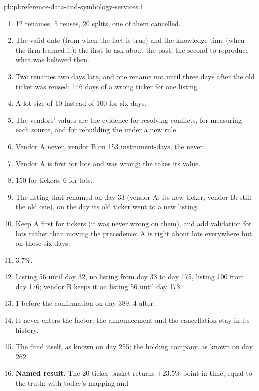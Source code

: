 \begin{solution}{pb:pl:reference-data-and-symbology-services:1}
\begin{enumerate}
\item 12 renames, 5 reuses, 20 splits, one of them cancelled.
\item The valid date (from when the fact is true) and the knowledge time (when the firm learned it): the first to ask about the
past, the second to reproduce what was believed then.
\item Two renames two days late, and one rename not until three days after the old ticker was reused: 146 days of a wrong
ticker for one listing.
\item A lot size of 10 instead of 100 for six days.
\item The vendors' values are the evidence for resolving conflicts, for measuring each source, and for rebuilding the 
under a new rule.
\item Vendor A never, vendor B on 153 instrument-days, the  never.
\item Vendor A is first for lots and was wrong; the  takes its value.
\item 150 for tickers, 6 for lots.
\item The listing that renamed on day 33 (vendor A: its new ticker; vendor B: still the old one), on the day its old ticker went to
a new listing.
\item Keep A first for tickers (it was never wrong on them), and add validation for lots rather than moving the precedence: A is
right about lots everywhere but on those six days.
\item 3.7\%.
\item Listing 56 until day 32, no listing from day 33 to day 175, listing 100 from day 176; vendor B keeps it on listing 56 until
day 178.
\item 1 before the confirmation on day 389, 4 after.
\item It never enters the factor; the announcement and the cancellation stay in its history.
\item The fund itself, as known on day 255; the holding company, as known on day 262.
\item \textbf{Named result.} The 20-ticker basket returns $+23.5\%$ point in time, equal to the truth; with today's mapping and

\end{enumerate}
\end{solution}
